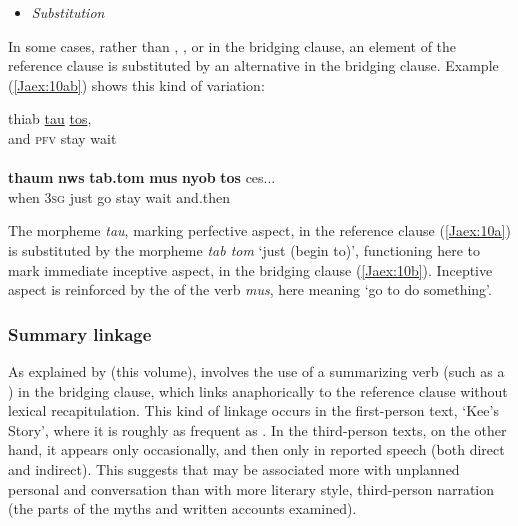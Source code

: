 \documentclass[output=paper]{LSP/langsci}
\begin{document}
\begin{itemize}
\item \textit{Substitution}
\end{itemize}
 
In some cases, rather than , , or  in the bridging clause, an element of the reference clause is substituted by an alternative in the bridging clause. Example (\ref{Jaex:10ab}) shows this kind of variation:
 
%
%

\begin{exe}
\ex \label{Jaex:10ab}
\begin{xlist}
\ex \label{Jaex:10a}
\gll thiab  \underline{tau} \underline{} \underline{tos},\\
and \textsc{pfv} stay wait\\
\glt {}\\
\ex \label{Jaex:10b}
\gll \textbf{thaum} \textbf{nws} \textbf{tab.tom} \textbf{mus} \textbf{nyob} \textbf{tos} ces...\\     	      
     when 3\textsc{sg} just go stay wait and.then\\
\glt {} \citep[][28]{vang90}
\end{xlist}
\end{exe}


\noindent
The morpheme \textit{tau}, marking perfective aspect, in the reference clause (\ref{Jaex:10a}) is substituted by the morpheme \textit{tab tom} `just (begin to)', functioning here to mark immediate inceptive aspect, in the bridging clause (\ref{Jaex:10b}). Inceptive aspect is reinforced by the  of the verb \textit{mus}, here meaning `go to do something'.
 
\subsubsection{Summary linkage}
\label{JaSummar}
As explained by \citeauthor{guerin18} (this volume),  involves the use of a summarizing verb (such as a ) in the bridging clause, which links anaphorically to the reference clause without lexical recapitulation. This kind of linkage occurs in the first-person text, `Kee’s Story', where it is roughly as frequent as . In the third-person texts, on the other hand, it appears only occasionally, and then only in reported speech (both direct and indirect). This suggests that  may be associated more with unplanned personal  and conversation than with more literary style, third-person narration (the  parts of the myths and written accounts examined).
 
\end{document}
